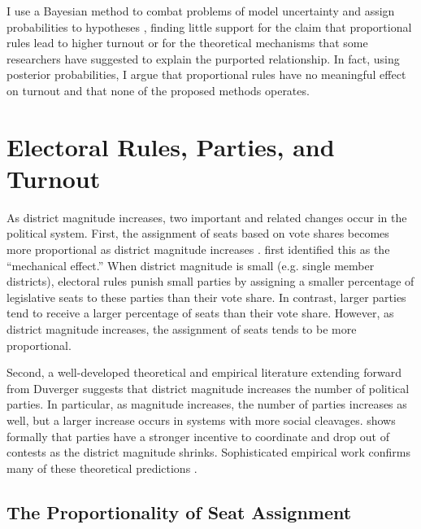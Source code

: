 \documentclass[12pt]{article}
\begin{document}
I use a Bayesian method to combat problems of model uncertainty and assign probabilities to hypotheses \citep{MontgomeryNyhan2010}, finding little support for the claim that proportional rules lead to higher turnout or for the theoretical mechanisms that some researchers have suggested to explain the purported relationship. In fact, using posterior probabilities, I argue that proportional rules have no meaningful effect on turnout and that none of the proposed methods operates.

\section*{Electoral Rules, Parties, and Turnout}

As district magnitude increases, two important and related changes occur in the political system. First, the assignment of seats based on vote shares becomes more proportional as district magnitude increases \citep{Cox1997, Benoit2000}. \cite{Duverger1954} first identified this as the ``mechanical effect.'' When district magnitude is small (e.g. single member districts), electoral rules punish small parties by assigning a smaller percentage of legislative seats to these parties than their vote share. In contrast, larger parties tend to receive a larger percentage of seats than their vote share. However, as district magnitude increases, the assignment of seats tends to be more proportional. 

Second, a well-developed theoretical and empirical literature extending forward from Duverger suggests that district magnitude increases the number of political parties. In particular, as magnitude increases, the number of parties increases as well, but a larger increase occurs in systems with more social cleavages.   \cite{Cox1999} shows formally that parties have a stronger incentive to coordinate and drop out of contests as the district magnitude shrinks. Sophisticated empirical work confirms many of these theoretical predictions \citep[e.g.][]{ClarkGolder2006}.

\subsection*{The Proportionality of Seat Assignment}
\end{document}
